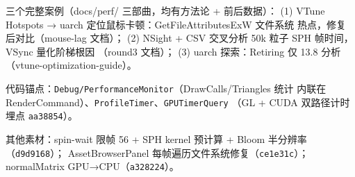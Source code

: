 三个完整案例（docs/perf/ 三部曲，均有方法论 + 前后数据）：
(1) VTune Hotspots → uarch 定位鼠标卡顿：GetFileAttributesExW 文件系统
热点，修复后对比（mouse-lag 文档）；
(2) NSight + CSV 交叉分析 50k 粒子 SPH 帧时间，VSync 量化阶梯根因
（round3 文档）；
(3) uarch 探索：Retiring 仅 13.8%
分析（vtune-optimization-guide）。

代码锚点：\texttt{Debug/PerformanceMonitor}（DrawCalls/Triangles 统计
内联在 RenderCommand）、\texttt{ProfileTimer}、\texttt{GPUTimerQuery}
（GL + CUDA 双路径计时埋点 \texttt{aa38854}）。

其他素材：spin-wait 限帧 56%
+ SPH kernel 预计算 + Bloom 半分辨率（\texttt{d9d9168}）；
AssetBrowserPanel 每帧遍历文件系统修复（\texttt{ce1e31c}）；
normalMatrix GPU→CPU（\texttt{a328224}）。

